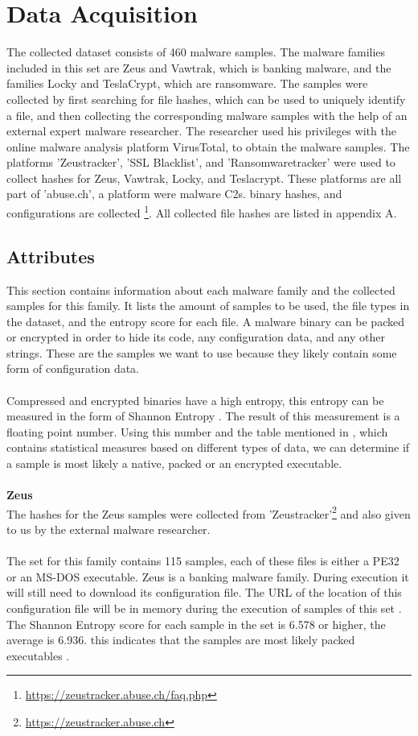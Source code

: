 \documentclass[conference]{IEEEtran}
\begin{document}
\section{Data Acquisition}

The collected dataset consists of 460 malware samples. The malware families included in this set are Zeus and Vawtrak, which is banking malware, and the families Locky and TeslaCrypt, which are ransomware.  The samples were collected  by first searching for file hashes, which can be used to uniquely identify a file,  and then collecting the corresponding malware samples with the help of an external expert malware researcher. The researcher used his privileges with the online malware analysis platform VirusTotal, to obtain the malware samples. The platforms 'Zeustracker', 'SSL Blacklist', and 'Ransomwaretracker' were used to collect hashes for Zeus, Vawtrak, Locky, and Teslacrypt. These platforms are all part of 'abuse.ch', a platform were malware C2s. binary hashes, and configurations are collected \footnote{\url{https://zeustracker.abuse.ch/faq.php}}. All collected file hashes are listed in appendix A.

\subsection{Attributes}	
This section contains information about each malware family and the collected samples for this family. It lists the amount of samples to be used, the file types in the dataset, and the entropy score for each file. A malware binary can be packed or encrypted in order to hide its code, any configuration data, and any other strings. These are the samples we want to use because they likely contain some form of configuration data. \\\\Compressed and encrypted binaries have a high entropy, this entropy can be measured in the form of Shannon Entropy \cite{hamrock-entropy}. The result of this measurement is a floating point number. Using this number and the table mentioned in \cite{hamrock-entropy}, which contains statistical measures based on different types of data, we can determine if a sample is most likely a native, packed or an encrypted executable.
\\\\

\textbf{Zeus}\\
The hashes for the Zeus samples were collected from 'Zeustracker'\footnote{\url{https://zeustracker.abuse.ch}} and also given to us by the external malware researcher. \\\\The set for this family contains 115 samples, each of these files is either a PE32 or an MS-DOS executable. Zeus is a banking malware family. During execution it will still need to download its configuration file. The URL of the location of this configuration file will be in memory during the execution of samples of this set \cite{wyke-zeus}. The Shannon Entropy score for each sample in the set is 6.578 or higher, the average is 6.936. this indicates that the samples are most likely packed executables \cite{hamrock-entropy}.\\
\end{document}
